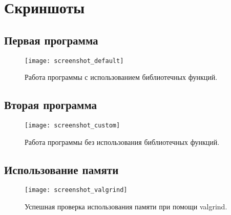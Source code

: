 \section{Скриншоты}

\subsection{Первая программа}
\begin{figure}[H]
  \centering
  \texttt{[image: screenshot\_default]}
  \caption{Работа программы с использованием библиотечных функций.}
\end{figure}

\subsection{Вторая программа}
\begin{figure}[H]
  \centering
  \texttt{[image: screenshot\_custom]}
  \caption{Работа программы без использования библиотечных функций.}
\end{figure}

\subsection{Использование памяти}
\begin{figure}[H]
  \centering
  \texttt{[image: screenshot\_valgrind]}
  \caption{Успешная проверка использования памяти при помощи valgrind.}
\end{figure}
